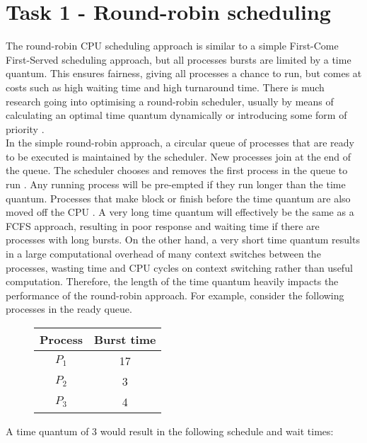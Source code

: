 \documentclass{article}
\newcommand{\n}[0]{\\[\baselineskip]}
\begin{document}
\section{Task 1 - Round-robin scheduling}
The round-robin CPU scheduling approach is similar to a simple First-Come First-Served scheduling approach, but all processes bursts are limited by a time quantum. This ensures fairness, giving all processes a chance to run, but comes at costs such as high waiting time and high turnaround time. There is much research going into optimising a round-robin scheduler, usually by means of calculating an optimal time quantum dynamically \cite{rr-paper3} \cite{rr-paper4} \cite{rr-paper2} or introducing some form of priority \cite{rr-paper5}.
\n
In the simple round-robin approach, a circular queue of processes that are ready to be executed is maintained by the scheduler. New processes join at the end of the queue. The scheduler chooses and removes the first process in the queue to run \cite{os}. Any running process will be pre-empted if they run longer than the time quantum. Processes that make block or finish before the time quantum are also moved off the CPU \cite{rr-paper}. A very long time quantum will effectively be the same as a FCFS approach, resulting in poor response and waiting time if there are processes with long bursts. On the other hand, a very short time quantum results in a large computational overhead of many context switches between the processes, wasting time and CPU cycles on context switching \cite{context-switch} rather than useful computation. Therefore, the length of the time quantum heavily impacts the performance of the round-robin approach. For example, consider the following processes in the ready queue.
\begin{figure}[H]
\centering
\begin{tabular}{c c}
\textbf{Process} & \textbf{Burst time} \\
\hline
$P_{1}$ & 17 \\
$P_{2}$ & 3 \\
$P_{3}$ & 4 \\
\end{tabular}
\end{figure}
\noindent 
A time quantum of 3 would result in the following schedule and wait times:
\end{document}
